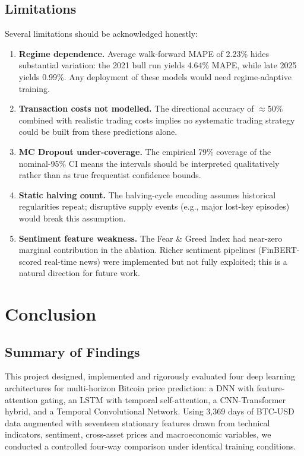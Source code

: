 \documentclass[12pt]{article}
\begin{document}
\subsection{Limitations}

Several limitations should be acknowledged honestly:
\begin{enumerate}[leftmargin=*]
    \item \textbf{Regime dependence.} Average walk-forward MAPE of 2.23\% hides substantial variation: the 2021 bull run yields 4.64\% MAPE, while late 2025 yields 0.99\%. Any deployment of these models would need regime-adaptive training.
    \item \textbf{Transaction costs not modelled.} The directional accuracy of $\approx 50\%$ combined with realistic trading costs implies no systematic trading strategy could be built from these predictions alone.
    \item \textbf{MC Dropout under-coverage.} The empirical 79\% coverage of the nominal-95\% CI means the intervals should be interpreted qualitatively rather than as true frequentist confidence bounds.
    \item \textbf{Static halving count.} The halving-cycle encoding assumes historical regularities repeat; disruptive supply events (e.g., major lost-key episodes) would break this assumption.
    \item \textbf{Sentiment feature weakness.} The Fear \& Greed Index had near-zero marginal contribution in the ablation. Richer sentiment pipelines (FinBERT-scored real-time news) were implemented but not fully exploited; this is a natural direction for future work.
\end{enumerate}

\section{Conclusion}

\subsection{Summary of Findings}

This project designed, implemented and rigorously evaluated four deep learning architectures for multi-horizon Bitcoin price prediction: a DNN with feature-attention gating, an LSTM with temporal self-attention, a CNN-Transformer hybrid, and a Temporal Convolutional Network. Using 3{,}369 days of BTC-USD data augmented with seventeen stationary features drawn from technical indicators, sentiment, cross-asset prices and macroeconomic variables, we conducted a controlled four-way comparison under identical training conditions.
\end{document}
